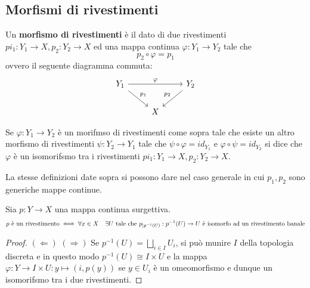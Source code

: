 \documentclass[]{article}
\begin{document}
\subsection{Morfismi di rivestimenti}

\begin{definition}  \nl
    Un \textbf{morfismo di rivestimenti} \`e il dato di due rivestimenti $pi_1: Y_1 \to X, p_2: Y_2 \to X$
    ed una mappa continua $\varphi: Y_1 \to Y_2$ tale che
    \[
        p_2 \circ \varphi = p_1
    \]
    ovvero il seguente diagramma commuta:
    \[\begin{tikzcd}
	{Y_1} && {Y_2} \\
	& X
	\arrow["\varphi", from=1-1, to=1-3]
	\arrow["{p_1}", from=1-1, to=2-2]
	\arrow["{p_2}"', from=1-3, to=2-2]
    \end{tikzcd}\]
\end{definition}

\begin{definition}  \nl
    Se $\varphi: Y_1 \to Y_2$ \`e un morifmso di rivestimenti come sopra tale che esiste un altro morfismo
    di rivestimenti $\psi: Y_2 \to Y_1$ tale che $\psi \circ \varphi = id_{Y_1}$ e $\varphi \circ \psi = id_{Y_2}$
    si dice che $\varphi$ \`e un isomorifsmo tra i rivestimenti $pi_1: Y_1 \to X, p_2: Y_2 \to X$.
\end{definition}

\begin{definition}  \nl
    La stesse definizioni date sopra si possono dare nel caso generale in cui $p_1, p_2$ sono generiche mappe continue.
\end{definition}

\begin{proposition}  \nl
    Sia $p: Y \to X$ una mappa continua surgettiva. \nl
    \[
        p \text{ \`e un rivestimento} \iff \forall x \in X \quad \exists U \text{ tale che } p_{|p^{-1}(U)}: p^{-1}(U) \to U \text{ \`e isomorfo ad un rivestimento banale}
    \]
\end{proposition}

\begin{proof} \nl
    $(\Leftarrow)$  \nl
    $(\Rightarrow)$ Se $p^{-1}(U) = \bigsqcup_{i \in I} U_i$, si pu\`o munire $I$ della topologia discreta
    e in questo modo $p^{-1}(U) \cong I \times U$ e la mappa $\varphi: Y \to I \times U: y \mapsto (i, p(y))$ se $y \in U_i$ \`e un omeomorfismo e dunque un isomorifsmo tra i due rivestimenti.
\end{proof}
\end{document}
